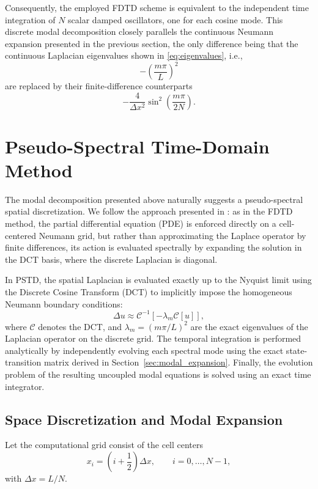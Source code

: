 \documentclass{Configuration_Files/PoliMi3i_thesis}
\begin{document}
Consequently, the employed FDTD scheme is equivalent to the independent time integration of $N$ scalar damped oscillators, one for each cosine mode. This discrete modal decomposition closely parallels the continuous Neumann expansion presented in the previous section, the only difference being that the continuous Laplacian eigenvalues shown in \eqref{eq:eigenvalues}, i.e.,
\[
-\left(\frac{m\pi}{L}\right)^2
\]
are replaced by their finite-difference counterparts
\[
-\frac{4}{\Delta x^2}
\sin^2\!\left(\frac{m\pi}{2N}\right).
\]

\section{Pseudo-Spectral Time-Domain Method}
The modal decomposition presented above naturally suggests a pseudo-spectral spatial discretization. We follow the approach presented in \cite{raghuvanshi_efficient_2009}: as in the FDTD method, the partial differential equation (PDE) is enforced directly on a cell-centered Neumann grid, but rather than approximating the Laplace operator by finite differences, its action is evaluated spectrally by expanding the solution in the DCT basis, where the discrete Laplacian is diagonal.

In PSTD, the spatial Laplacian is evaluated exactly up to the Nyquist limit using the Discrete Cosine Transform (DCT) to implicitly impose the homogeneous Neumann boundary conditions:
\begin{equation}
    \Delta u \approx \mathcal{C}^{-1} \left[ -\lambda_m \mathcal{C}[u] \right],
\end{equation}
where $\mathcal{C}$ denotes the DCT, and $\lambda_m = (m\pi/L)^2$ are the exact eigenvalues of the Laplacian operator on the discrete grid. The temporal integration is performed analytically by independently evolving each spectral mode using the exact state-transition matrix derived in Section~\ref{sec:modal_expansion}. Finally, the evolution problem of the resulting uncoupled modal equations is solved using an exact time integrator.

\subsection{Space Discretization and Modal Expansion}
Let the computational grid consist of the cell centers
\begin{equation*}
x_i
=
\left(i+\frac12\right)\Delta x,
\qquad
i=0,\ldots,N-1,
\end{equation*}
with $\Delta x=L/N$.
\end{document}
